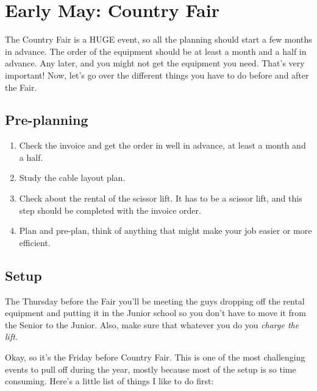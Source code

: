 \documentclass[letterpaper,10pt,oneside,headsepline]{scrreprt}
\begin{document}

\section{Early May: Country Fair}
The Country Fair is a HUGE event, so all the planning should start a few months in advance. The order of the equipment should be at least a month and a half in advance. Any later, and you might not get the equipment you need. That's very important! Now, let's go over the different things you have to do before and after the Fair.

\subsection{Pre-planning}
\begin{enumerate}
\item Check the invoice and get the order in well in advance, at least a month and a half.
\item Study the cable layout plan.
\item Check about the rental of the scissor lift. It has to be a scissor lift, and this step should be completed with the invoice order.
\item Plan and pre-plan, think of anything that might make your job easier or more efficient.
\end{enumerate}

\subsection{Setup}
The Thursday before the Fair you'll be meeting the guys dropping off the rental equipment and putting it in the Junior school so you don't have to move it from the Senior to the Junior. Also, make sure that whatever you do you \textit{charge the lift.}

Okay, so it's the Friday before Country Fair. This is one of the most challenging events to pull off during the year, mostly because most of the setup is so time consuming. Here's a little list of things I like to do first:
\end{document}
